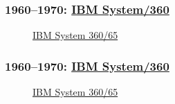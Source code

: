 \documentclass[ignorenonframetext, hyperref=unicode]{beamer}
\begin{document}
\begin{frame}
\frametitle{1960--1970: \href{http://en.wikipedia.org/wiki/System/360}{IBM
System/360}} 
\begin{figure}
\center
{}
\caption{\href{http://www.cs.newcastle.ac.uk/events/anniversaries/40th/images/ibm360_672/index.html}{IBM System 360/65}}
\end{figure}
\end{frame}

\begin{frame}
\frametitle{1960--1970: \href{http://en.wikipedia.org/wiki/System/360}{IBM
System/360}} 
\begin{figure}
\center
{}
\caption{\href{http://www.cs.newcastle.ac.uk/events/anniversaries/40th/images/ibm360_672/index.html}{IBM System 360/65}}
\end{figure}
\end{frame}
\end{document}
